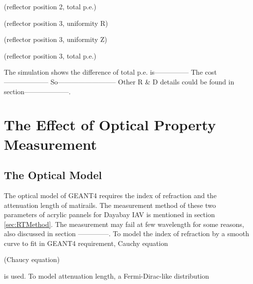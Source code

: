 (reflector position 2, total p.e.)




(reflector position 3, uniformity R)




(reflector position 3, uniformity Z)




(reflector position 3, total p.e.)


The simulation shows the difference of total p.e. is---------------
The cost--------------------
So--------------------------
Other R \& D details could be found in section--------------------.


\section {The Effect of Optical Property Measurement}
\subsection {The Optical Model}

The optical model of GEANT4 requires the index of refraction and the attenuation length
of matirails. The measurement method of these two parameters of acrylic pannels for Dayabay IAV
is mentioned in section \ref{sec:RTMethod}.
The measurement may fail at few wavelength for some reasons, also discussed
in section --------------.
To model the index of refraction by a smooth curve to fit in GEANT4 requirement, Cauchy equation


(Chaucy equation)


is used. To model attenuation length, a Fermi-Dirac-like distribution




